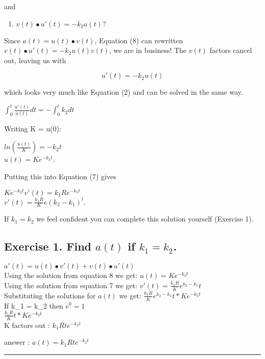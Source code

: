 \documentclass[]{article}
\providecommand{\tightlist}{%
  \setlength{\itemsep}{0pt}\setlength{\parskip}{0pt}}
\begin{document}
and

\begin{enumerate}
\def\labelenumi{(\arabic{enumi})}
\setcounter{enumi}{7}
\tightlist
\item
  \(v(t) \bullet u'(t) = -k_2a(t)?\)
\end{enumerate}

Since \(a(t) = u(t) \bullet v(t)\), Equation (8) can rewritten
\(v(t) \bullet u'(t) = -k_2u(t)v(t)\), we are in business! The \(v(t)\)
factors cancel out, leaving us with

\[u'(t) = -k_2u(t)\]

which looks very much like Equation (2) and can be solved in the same
way.

\(\int_0^t \frac{u'(t)}{u(t)} dt = -\int_0^t k_2dt\)

Writing K = u(0):

\(ln (\frac{u(t)}{K}) = -k_2t\)\\
\(u(t) = Ke^{-k_2t}\).

Putting this into Equation (7) gives

\(Ke^{-k_2t}v'(t) = k_1Re^{-k_1t}\)\\
\(v'(t) = \frac{k_1R}{K}e(k_2-k_1)^t\).

If \(k_1 = k_2\) we feel confident you can complete this solution
yourself (Exercise 1).

\subsection{\texorpdfstring{Exercise 1. Find \(a(t)\) if
\(k_1 = k_2\).}{Exercise 1. Find a(t) if k\_1 = k\_2.}}\label{exercise-1.-find-at-if-k_1-k_2.}

\(a'(t) = u(t) \bullet v'(t) + v(t) \bullet u'(t)\)\\
Using the solution from equation 8 we get: \(u(t) = Ke^{-k_2t}\)\\
Using the solution from equation 7 we get:
\(v'(t) = \frac{k_1R}{K}e^{k_2 - k_1}t\)\\
Substituting the solutions for \(a(t)\) we get:
\(\frac{k_1R}{K}e^{k_2 - k_1}t * Ke^{-k_2t}\)\\
If k\_1 = k\_2 then \(e^{0} = 1\)\\
\(\frac{k_1R}{K}t * Ke^{-k_2t}\)\\
K factors out : \(k_1Rte^{-k_2t}\)

answer : \(a(t) = k_1Rte^{-k_2t}\)

\begin{center}\rule{0.5\linewidth}{\linethickness}\end{center}
\end{document}
